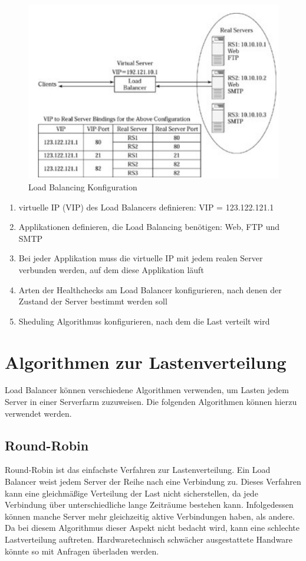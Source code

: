 \begin{figure}[!h]
	\begin{center}
		\includegraphics[width=0.6\linewidth]{images/loadbalancing8.jpg}
		\caption{Load Balancing Konfiguration \cite{LoadBalancing2}}
		\label{Load Balancing Konfiguration}
	\end{center}
\end{figure}
\begin{enumerate}
\item virtuelle IP (VIP) des Load Balancers definieren: VIP = 123.122.121.1
\item Applikationen definieren, die Load Balancing benötigen: Web, FTP und SMTP
\item Bei jeder Applikation muss die virtuelle IP mit jedem realen Server verbunden werden, auf dem diese Applikation läuft
\item Arten der Healthchecks am Load Balancer konfigurieren, nach denen der Zustand der Server bestimmt werden soll
\item Sheduling Algorithmus konfigurieren, nach dem die Last verteilt wird \cite{LoadBalancing2}
\end{enumerate}

\section{Algorithmen zur Lastenverteilung}
\label{sec:Algorithmen zur Lastenverteilung}
Load Balancer können verschiedene Algorithmen verwenden, um Lasten jedem Server in einer Serverfarm zuzuweisen. Die folgenden Algorithmen können hierzu verwendet werden.

\subsection{Round-Robin}
\label{sec:Round-Robin}
Round-Robin ist das einfachste Verfahren zur Lastenverteilung.
Ein Load Balancer weist jedem Server der Reihe nach eine Verbindung zu.
Dieses Verfahren kann eine gleichmäßige Verteilung der Last nicht sicherstellen, da jede Verbindung über unterschiedliche lange Zeiträume bestehen kann. Infolgedessen können manche Server mehr gleichzeitig aktive Verbindungen haben, als andere. \cite{LoadBalancing2}
Da bei diesem Algorithmus dieser Aspekt nicht bedacht wird, kann eine schlechte Lastverteilung auftreten. Hardwaretechnisch schwächer ausgestattete Handware könnte so mit Anfragen überladen werden.

